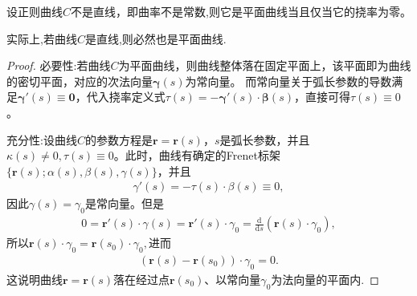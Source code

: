 \documentclass[../../main.tex]{subfiles}%
\begin{document}
\begin{theorem}\label{theorem:挠率为0等价于是平面曲线}
设正则曲线$C$不是直线，即曲率不是常数,则它是平面曲线当且仅当它的挠率为零。
\end{theorem}
\begin{remark}
实际上,若曲线$C$是直线,则必然也是平面曲线.
\end{remark}
\begin{proof}

{\heiti 必要性:}若曲线$C$为平面曲线，则曲线整体落在固定平面上，该平面即为曲线的密切平面，对应的次法向量$\bm{\gamma}(s)$为常向量。
而常向量关于弧长参数的导数满足$\bm{\gamma}'(s) \equiv \bm{0}$，代入挠率定义式$\tau(s) = -\bm{\gamma}'(s) \cdot \bm{\beta}(s)$，直接可得$\tau(s) \equiv 0$。

{\heiti 充分性:}设曲线$C$的参数方程是$\bm{r} = \bm{r}(s)$，$s$是弧长参数，并且$\kappa(s) \neq 0, \tau(s) \equiv 0$。此时，曲线有确定的Frenet标架$\{\bm{r}(s); \alpha(s), \beta(s), \gamma(s)\}$，并且
\begin{align*}
\gamma'(s) = -\tau(s) \cdot \beta(s) \equiv 0,
\end{align*}
因此$\gamma(s) = \gamma_0 $是常向量。但是
\begin{align*}
0 = \bm{r}'(s) \cdot \gamma(s) = \bm{r}'(s) \cdot \gamma_0 = \frac{\mathrm{d}}{\mathrm{d}s} (\bm{r}(s) \cdot \gamma_0),
\end{align*}
所以$\bm{r}(s) \cdot \gamma_0 = \bm{r}(s_0) \cdot \gamma_0,$进而
\begin{align*}
(\bm{r}(s) - \bm{r}(s_0)) \cdot \gamma_0 = 0.
\end{align*}
这说明曲线$\bm{r} = \bm{r}(s)$落在经过点$\bm{r}(s_0)$、以常向量$\gamma_0$为法向量的平面内.

\end{proof}
\end{document}
